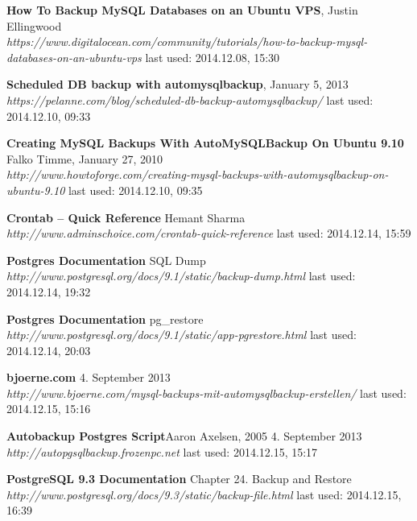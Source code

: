 \documentclass[10pt]{article}
\begin{document}
\begin{thebibliography}{56}
  \textbf{How To Backup MySQL Databases on an Ubuntu VPS},  Justin Ellingwood \\
  \textit{https://www.digitalocean.com/community/tutorials/how-to-backup-mysql-databases-on-an-ubuntu-vps}
  \newline last used: 2014.12.08, 15:30
  


  \textbf{Scheduled DB backup with automysqlbackup}, January 5, 2013 \\
  \textit{https://pelanne.com/blog/scheduled-db-backup-automysqlbackup/}
  \newline last used: 2014.12.10, 09:33
  
  \textbf{Creating MySQL Backups With AutoMySQLBackup On Ubuntu 9.10}\\ Falko Timme, January 27, 2010 \\
  \textit{http://www.howtoforge.com/creating-mysql-backups-with-automysqlbackup-on-ubuntu-9.10}
  \newline last used: 2014.12.10, 09:35
  
  
  \textbf{Crontab – Quick Reference}  Hemant Sharma \\
  \textit{http://www.adminschoice.com/crontab-quick-reference}
  \newline last used: 2014.12.14, 15:59
  
  \textbf{Postgres Documentation} SQL Dump\\
  \textit{http://www.postgresql.org/docs/9.1/static/backup-dump.html}
  \newline last used: 2014.12.14, 19:32
    
  \textbf{Postgres Documentation} pg\_restore\\
  \textit{  http://www.postgresql.org/docs/9.1/static/app-pgrestore.html}
  \newline last used: 2014.12.14, 20:03

  \textbf{bjoerne.com} 4. September 2013\\
  \textit{http://www.bjoerne.com/mysql-backups-mit-automysqlbackup-erstellen/}
  \newline last used: 2014.12.15, 15:16

  \textbf{Autobackup Postgres Script}Aaron Axelsen, 2005 4. September 2013\\
  \textit{http://autopgsqlbackup.frozenpc.net}
  \newline last used: 2014.12.15, 15:17
  
  \textbf{PostgreSQL 9.3 Documentation} Chapter 24. Backup and Restore	\\
  \textit{http://www.postgresql.org/docs/9.3/static/backup-file.html}
  \newline last used: 2014.12.15, 16:39
	
	
	
\end{thebibliography}
\end{document}
